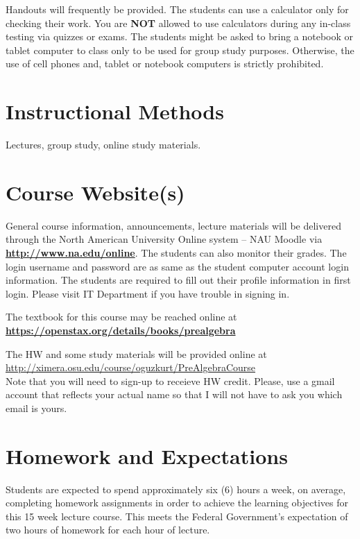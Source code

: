 \documentclass[handout]{ximera}
\begin{document}
Handouts will frequently be provided. The students can use a calculator only for checking their work. You are {\bf NOT} allowed to use calculators during any in-class testing via quizzes or exams.  The students might be asked to bring a notebook or tablet computer to class only to be used for group study purposes. Otherwise, the use of cell phones and, tablet or notebook computers is strictly prohibited. 

\section*{Instructional Methods}

Lectures, group study, online study materials.

\section*{Course Website(s)}

General course information, announcements, lecture materials will be delivered through the North American University Online system – NAU Moodle via \href{http://www.na.edu/online}{\bf http://www.na.edu/online}. The students can also monitor their grades. The login username and password are as same as the student computer account login information. The students are required to fill out their profile information in first login. Please visit IT Department if you have trouble in signing in.

The textbook for this course may be reached online at 
\\ 
\href{https://openstax.org/details/books/prealgebra}{\bf https://openstax.org/details/books/prealgebra}

The HW and some study materials will be provided online at 
\\ 
\href{http://ximera.osu.edu/course/oguzkurt/PreAlgebraCourse}{http://ximera.osu.edu/course/oguzkurt/PreAlgebraCourse} 
\\
Note that you will need to sign-up to receieve HW credit. Please, use a gmail account that reflects your actual name so that I will not have to ask you which email is yours.

\section*{Homework and Expectations}

Students are expected to spend approximately six (6) hours a week, on average, completing homework assignments in order to achieve the learning objectives for this 15 week lecture course. This meets the Federal Government’s expectation of two hours of homework for each hour of lecture. 
\end{document}
